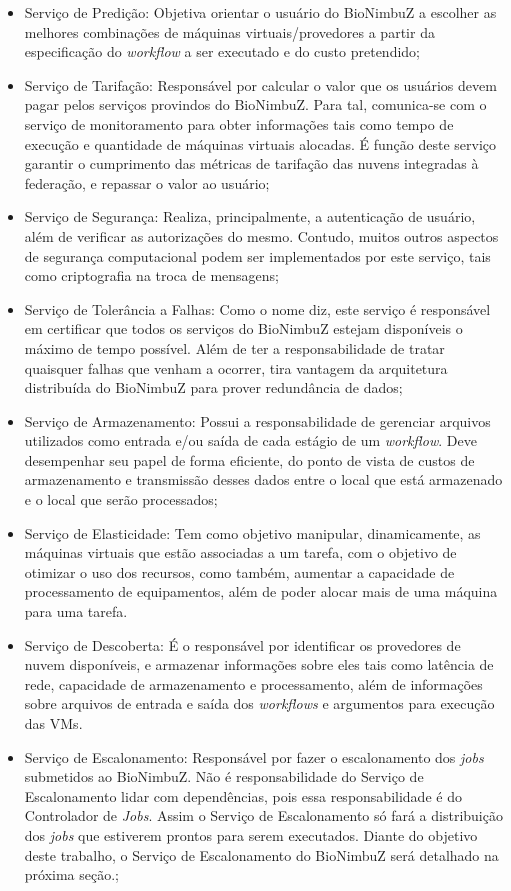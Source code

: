 	\begin{itemize}
		\item Serviço de Predição: Objetiva orientar o usuário do BioNimbuZ a escolher as melhores combinações de máquinas virtuais/provedores a partir da especificação do \textit{workflow} a ser executado e do custo pretendido;
		\item Serviço de Tarifação: Responsável por calcular o valor que os usuários devem pagar pelos serviços provindos do BioNimbuZ. Para tal, comunica-se com o serviço de monitoramento para obter informações tais como tempo de execução e quantidade de máquinas virtuais alocadas. É função deste serviço garantir o cumprimento das métricas de tarifação das nuvens integradas à federação, e repassar o valor ao usuário;
		\item Serviço de Segurança: Realiza, principalmente, a autenticação de usuário, além de verificar as autorizações do mesmo. Contudo, muitos outros aspectos de segurança computacional podem ser implementados por este serviço, tais como criptografia na troca de mensagens;
		\item Serviço de Tolerância a Falhas: Como o nome diz, este serviço é responsável em certificar que todos os serviços do BioNimbuZ estejam disponíveis o máximo de tempo possível. Além de ter a responsabilidade de tratar quaisquer falhas que venham a ocorrer, tira vantagem da arquitetura distribuída do BioNimbuZ para prover redundância de dados;
		\item Serviço de Armazenamento: Possui a responsabilidade de gerenciar arquivos utilizados como entrada e/ou saída de cada estágio de um \textit{workflow}. Deve desempenhar seu papel de forma eficiente, do ponto de vista de custos de armazenamento e transmissão desses dados entre o local que está armazenado e o local que serão processados;
		\item Serviço de Elasticidade: Tem como objetivo manipular, dinamicamente, as máquinas virtuais que estão associadas a um tarefa, com o objetivo de otimizar o uso dos recursos, como também, aumentar a capacidade de processamento de equipamentos, além de poder alocar mais de uma máquina para uma tarefa.
		\item Serviço de Descoberta: É o responsável por identificar os provedores de nuvem disponíveis, e armazenar informações sobre eles tais como latência de rede, capacidade de armazenamento e processamento, além de informações sobre arquivos de entrada e saída dos \textit{workflows} e argumentos para execução das \acrshort{VM}s.
		\item Serviço de Escalonamento: Responsável por fazer o escalonamento dos \textit{jobs} submetidos ao BioNimbuZ. Não é responsabilidade do Serviço de Escalonamento lidar com dependências, pois essa responsabilidade é do Controlador de \textit{Jobs}. Assim o Serviço de Escalonamento só fará a distribuição dos \textit{jobs} que estiverem prontos para serem executados. Diante do objetivo deste trabalho, o Serviço de Escalonamento do BioNimbuZ será detalhado na próxima seção.;

\end{itemize}
